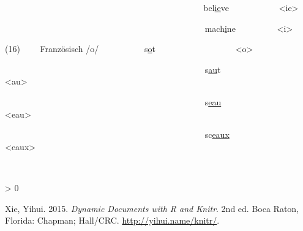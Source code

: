 \documentclass[
]{article}
\newlength{\cslhangindent}
\newenvironment{CSLReferences}[2] %
 {%
  \setlength{\parindent}{0pt}
  \ifodd #1 \everypar{\setlength{\hangindent}{\cslhangindent}}\ignorespaces\fi
  \ifnum #2 > 0
  \setlength{\parskip}{#2\baselineskip}
  \fi
 }%
 {}
\begin{document}
~~~~~~~~~~~ ~~~~~~~~~~~~~~~~~~~~~~~~~~~~~~~~~~ bel\underline{ie}ve~~~~~~~~~~~
\textless ie\textgreater{}

~~~~~~~~~~~~~~~~~~~~~~~~~~~~~~~~~~~~~~~~~~~~~~ mach\underline{i}ne~~~~~~~~~
\textless i\textgreater{}

(16)~~~~ Französisch /o/~~~~~~~~~~ s\underline{o}t~~~~~~~~~~~~~~~~~~ \textless o\textgreater{}

~~~~~~~~~~~~~~~~~~~~~~~~~~~~~~~~~~~~~~~~~~~~~~
s\underline{au}t~~~~~~~~~~~~~~~~ \textless au\textgreater{}

~~~~~~~~~~~~~~~~~~~~~~~~~~~~~~~~~~~~~~~~~~~~~~
s\underline{eau}~~~~~~~~~~~~~~~ \textless eau\textgreater{}

~~~~~~~~~~~~~~~~~~~~~~~~~~~~~~~~~~~~~~~~~~~~~~ sc\underline{eaux}~~~~~~~~~~~~
\textless eaux\textgreater{}

~

\hypertarget{refs}{}
\begin{CSLReferences}{1}{0}
\leavevmode\hypertarget{ref-xie2015}{}%
Xie, Yihui. 2015. \emph{Dynamic Documents with {R} and Knitr}. 2nd ed. Boca Raton, Florida: Chapman; Hall/CRC. \url{http://yihui.name/knitr/}.

\end{CSLReferences}
\end{document}
